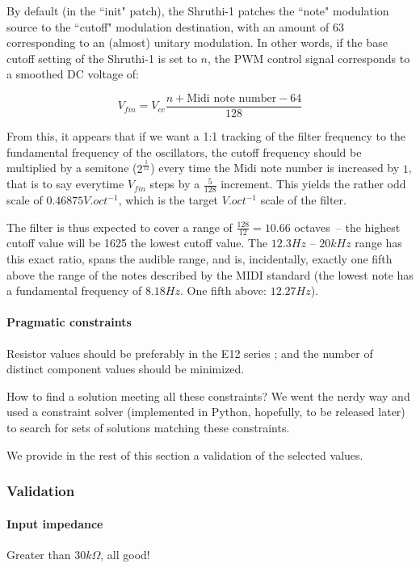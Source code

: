 \documentclass[a4paper,11pt]{article}
\begin{document}
By default (in the ``init" patch), the Shruthi-1 patches the ``note" modulation source to the ``cutoff" modulation destination, with an amount of 63 corresponding to an (almost) unitary modulation. In other words, if the base cutoff setting of the Shruthi-1 is set to $n$, the PWM control signal corresponds to a smoothed DC voltage of:

\begin{equation}
V_{fin} = V_{cc} \frac{n + \mbox{Midi note number} - 64}{128}
\end{equation}

From this, it appears that if we want a 1:1 tracking of the filter frequency to the fundamental frequency of the oscillators, the cutoff frequency should be multiplied by a semitone ($2^\frac{1}{12}$) every time the Midi note number is increased by $1$, that is to say everytime $V_{fin}$ steps by a $\frac{5}{128}$ increment. This yields the rather odd scale of $0.46875V.oct^{-1}$, which is the target $V.oct^{-1}$ scale of the filter.

The filter is thus expected to cover a range of $\frac{128}{12} = 10.66$ octaves~-- the highest cutoff value will be 1625 the lowest cutoff value. The $12.3 Hz$ -- $20kHz$ range has this exact ratio, spans the audible range, and is, incidentally, exactly one fifth above the range of the notes described by the MIDI standard (the lowest note has a fundamental frequency of $8.18 Hz$. One fifth above: $12.27 Hz$).

\paragraph{Pragmatic constraints} Resistor values should be preferably in the E12 series ; and the number of distinct component values should be minimized.

How to find a solution meeting all these constraints? We went the nerdy way and used a constraint solver (implemented in Python, hopefully, to be released later) to search for sets of solutions matching these constraints.

We provide in the rest of this section a validation of the selected values.

\subsubsection{Validation}

\paragraph{Input impedance} Greater than $30k\Omega$, all good!
\end{document}
